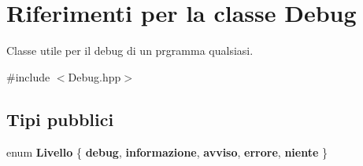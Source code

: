 \hypertarget{class_debug}{}\section{Riferimenti per la classe Debug}
\label{class_debug}


Classe utile per il debug di un prgramma qualsiasi.  




{\ttfamily \#include $<$Debug.\+hpp$>$}

\subsection*{Tipi pubblici}
\begin{DoxyCompactItemize}
\item 
\mbox{\label{class_debug_a9489727ab968e77199b313f124372a02}} 
enum {\bfseries Livello} \{ \newline
{\bfseries debug}, 
{\bfseries informazione}, 
{\bfseries avviso}, 
{\bfseries errore}, 
\newline
{\bfseries niente}
 \}
\end{DoxyCompactItemize}

